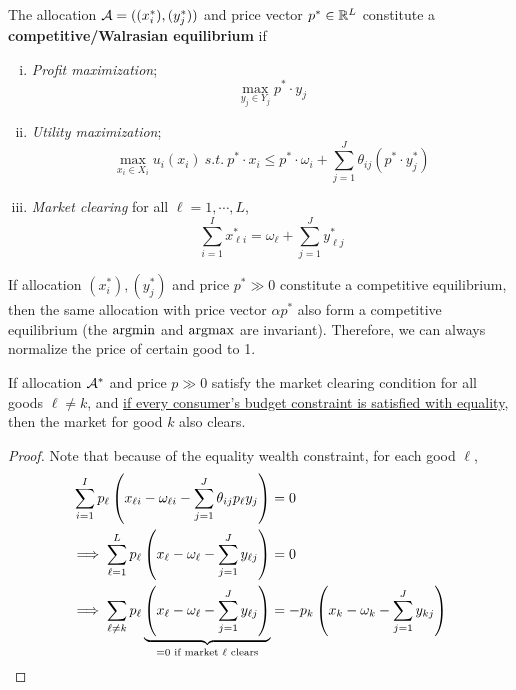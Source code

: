 \documentclass{report}
\begin{document}
	 	\begin{definition}[10.B.3]
	 		The allocation $\mathcal{{A}} = ((x_i^*), (y_j^*))$ and price vector $p^* \in \mathbb{R}^L$ constitute a \textbf{competitive/Walrasian equilibrium} if 
	 		\begin{enumerate}[(i)]
	 			\item \emph{Profit maximization};
		 			\begin{equation}
		 				\max_{y_j \in Y_j} p^* \cdot y_j
		 			\end{equation}
	 			\item \emph{Utility maximization};
	 				\begin{equation}
	 					\max_{x_i \in X_i} u_i(x_i)\ s.t.\ 
	 					p^* \cdot x_i \leq p^* \cdot \omega_i + \sum_{j=1}^J \theta_{ij} (p^* \cdot y^*_j)
	 				\end{equation}
	 			\item \emph{Market clearing} for all $\ell = 1, \cdots, L$,
	 				\begin{equation}
	 					\sum_{i=1}^I x^*_{\ell i} = \omega_\ell + \sum_{j=1}^J y^*_{\ell j}
	 				\end{equation}
	 		\end{enumerate}
	 	\end{definition}
	 	
	 	\begin{remark}
	 		If allocation $(x_i^*), (y_j^*)$ and price $p^* \gg 0$ constitute a competitive equilibrium, then the same allocation with price vector $\alpha p^*$ also form a competitive equilibrium (the $\operatorname*{argmin}$ and $\operatorname*{argmax}$ are invariant). Therefore, we can always normalize the price of certain good to 1.
	 	\end{remark}
	 	
	 	\begin{lemma}
	 		If allocation $\mathcal{{A}}^*$ and price $p \gg 0$ satisfy the market clearing condition for all goods $\ell \neq k$, and \ul{if every consumer's budget constraint is satisfied with equality}, then the market for good $k$ also clears.
	 	\end{lemma}
	 	
	 	\begin{proof}
	 		Note that because of the equality wealth constraint, for each good $\ell$, 
	 		\begin{align}
	 			\sum_{i=1}^I
	 				p_\ell \left( x_{\ell i} - \omega_{\ell i} - \sum_{j=1}^J \theta_{ij} p_\ell y_j
	 				\right ) &= 0
	 			\\ \implies 
	 			\sum_{\ell=1}^L p_\ell 
	 				\left (
	 					x_\ell - \omega_\ell - \sum_{j=1}^J y_{\ell j} 
	 				\right ) &= 0
	 			\\ \implies 
	 			\sum_{\ell \neq k} p_\ell 
	 				\underbrace{ \left (
	 					x_\ell - \omega_\ell - \sum_{j=1}^J y_{\ell j}
	 				\right ) }_{=0\text{{ if market $\ell$ clears}}}
	 				&= - p_k
	 				\left (
	 					x_k - \omega_k - \sum_{j=1}^J y_{k j}
	 				\right )
	 		\end{align}
	 	\end{proof}
	 	
\end{document}

